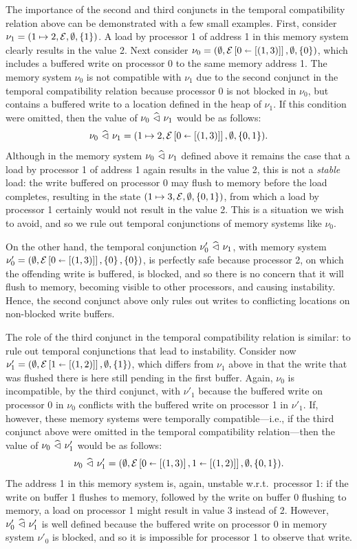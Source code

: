\documentclass[11pt]{report}
\begin{document}
The importance of the second and third conjuncts in the temporal compatibility relation above can be demonstrated with a few small examples. First, consider $\nu_1 = (1 \mapsto 2, \mathcal{E}, \operatorname{\emptyset}, \left\lbrace 1 \right\rbrace)$. A load by processor 1 of address 1 in this memory system clearly results in the value 2. Next consider $\nu_0 = (\operatorname{\emptyset},\mathcal{E} \left[ 0 \shortleftarrow \left[(1,3)\right] \right],\operatorname{\emptyset},\left\lbrace 0 \right\rbrace)$, which includes a buffered write on processor 0 to the same memory address 1. The memory system $\nu_0$ is not compatible with $\nu_1$ due to the second conjunct in the temporal compatibility relation because processor 0 is not blocked in $\nu_0$, but contains a buffered write to a location defined in the heap of $\nu_1$. If this condition were omitted, then the value of $\nu_0 \operatorname{\,\widehat{\vartriangleleft}\,} \nu_1$ would be as follows: \[ \nu_0 \operatorname{\,\widehat{\vartriangleleft}\,} \nu_1 = (1 \mapsto 2, \mathcal{E} \left[ 0 \shortleftarrow \left[(1,3)\right] \right], \operatorname{\emptyset}, \left\lbrace 0,1 \right\rbrace).\] Although in the memory system $\nu_0 \operatorname{\,\widehat{\vartriangleleft}\,} \nu_1$ defined above it remains the case that a load by processor 1 of address 1 again results in the value 2, this is not a \emph{stable} load: the write buffered on processor 0 may flush to memory before the load completes, resulting in the state $(1 \mapsto 3, \mathcal{E}, \operatorname{\emptyset}, \left\lbrace 0,1 \right\rbrace)$, from which a load by processor 1 certainly would not result in the value 2. This is a situation we wish to avoid, and so we rule out temporal conjunctions of memory systems like $\nu_0$. 

On the other hand, the temporal conjunction $\nu'_0 \operatorname{\,\widehat{\vartriangleleft}\,} \nu_1$, with memory system $\nu'_0 = (\operatorname{\emptyset},\mathcal{E} \left[ 0 \shortleftarrow \left[(1,3)\right] \right],\left\lbrace 0 \right\rbrace,\left\lbrace 0 \right\rbrace)$, is perfectly safe because processor 2, on which the offending write is buffered, is blocked, and so there is no concern that it will flush to memory, becoming visible to other processors, and causing instability. Hence, the second conjunct above only rules out writes to conflicting locations on non-blocked write buffers. 

The role of the third conjunct in the temporal compatibility relation is similar: to rule out temporal conjunctions that lead to instability. Consider now $\nu'_1 = (\operatorname{\emptyset},\mathcal{E} \left[ 1 \shortleftarrow \left[(1,2)\right] \right], \operatorname{\emptyset}, \left\lbrace 1 \right\rbrace)$, which differs from $\nu_1$ above in that the write that was flushed there is here still pending in the first buffer. Again, $\nu_0$ is incompatible, by the third conjunct, with $\nu'_1$ because the buffered write on processor 0 in $\nu_0$ conflicts with the buffered write on processor 1 in $\nu'_1$. If, however, these memory systems were temporally compatible---i.e., if the third conjunct above were omitted in the temporal compatibility relation---then the value of $\nu_0 \operatorname{\,\widehat{\vartriangleleft}\,} \nu'_1$ would be as follows: \[ \nu_0 \operatorname{\,\widehat{\vartriangleleft}\,} \nu'_1 = (\operatorname{\emptyset}, \mathcal{E} \left[ 0 \shortleftarrow \left[(1,3)\right], 1 \shortleftarrow \left[(1,2)\right] \right], \operatorname{\emptyset}, \left\lbrace 0,1 \right\rbrace).\] The address 1 in this memory system is, again, unstable w.r.t.\ processor 1: if the write on buffer 1 flushes to memory, followed by the write on buffer 0 flushing to memory, a load on processor 1 might result in value 3 instead of 2. However, $\nu'_0 \operatorname{\,\widehat{\vartriangleleft}\,} \nu'_1$ is well defined because the buffered write on processor 0 in memory system $\nu'_0$ is blocked, and so it is impossible for processor 1 to observe that write. 
\end{document}
